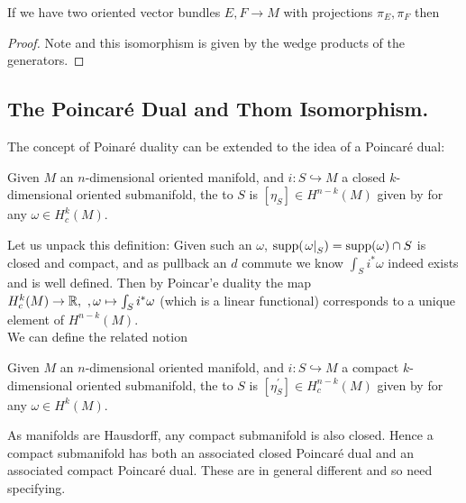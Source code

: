 \documentclass{article}
\begin{document}
\begin{prop}
	If we have two oriented vector bundles $E,F \to M$ with projections $\pi_E, \pi_F$ then 
\end{prop}
\begin{proof}
	Note 
and this isomorphism is given by the wedge products of the generators. 
\end{proof}


\subsection{The Poincar\'e Dual and Thom Isomorphism. }
The concept of Poinar\'e duality can be extended to the idea of a Poincar\'e dual:

\begin{definition}
	Given $M$ an $n$-dimensional oriented manifold, and $i:S \hookrightarrow M$ a closed $k$-dimensional oriented submanifold, the  to $S$ is $[\eta_S]\in H^{n-k}(M)$ given by 
	for any $\omega \in H_c^k(M)$. 
\end{definition}

Let us unpack this definition: Given such an $\omega$, $\operatorname{supp}(\left. \omega \right\rvert_{S}) = \operatorname{supp}(\omega) \cap S$ is closed and compact, and as pullback an $d$ commute we know $\int_S i^\ast \omega$ indeed exists and is well defined. Then by Poincar'e duality the map $H_c^k(M) \to \mathbb{R}, \ ,\omega \mapsto \int_S i^\ast \omega$ (which is a linear functional) corresponds to a unique element of $H^{n-k}(M)$. \\
We can define the related notion 
\begin{definition}
	Given $M$ an $n$-dimensional oriented manifold, and $i:S \hookrightarrow M$ a compact $k$-dimensional oriented submanifold, the  to $S$ is $[\eta_S^\prime]\in H^{n-k}_c(M)$ given by 
	for any $\omega \in H^k(M)$. 	
\end{definition}

\begin{remark}
	As manifolds are Hausdorff, any compact submanifold is also closed. Hence a compact submanifold has both an associated closed Poincar\'e dual and an associated compact Poincar\'e dual. These are in general different and so need specifying. 
\end{remark}
\end{document}
